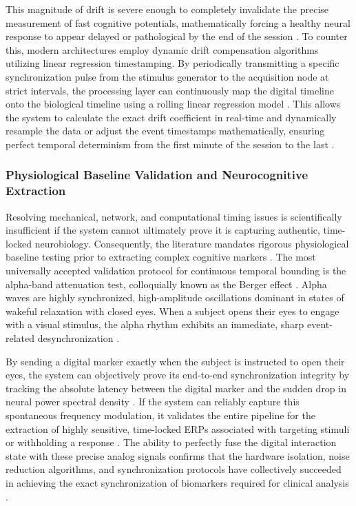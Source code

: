 This magnitude of drift is severe enough to completely invalidate the precise measurement of fast cognitive potentials, mathematically forcing a healthy neural response to appear delayed or pathological by the end of the session \cite{getzmann2024auditory}. To counter this, modern architectures employ dynamic drift compensation algorithms utilizing linear regression timestamping. By periodically transmitting a specific synchronization pulse from the stimulus generator to the acquisition node at strict intervals, the processing layer can continuously map the digital timeline onto the biological timeline using a rolling linear regression model \cite{li2022intelligent}. This allows the system to calculate the exact drift coefficient in real-time and dynamically resample the data or adjust the event timestamps mathematically, ensuring perfect temporal determinism from the first minute of the session to the last \cite{weber2025methods}.

\subsubsection{Physiological Baseline Validation and Neurocognitive Extraction}

Resolving mechanical, network, and computational timing issues is scientifically insufficient if the system cannot ultimately prove it is capturing authentic, time-locked neurobiology. Consequently, the literature mandates rigorous physiological baseline testing prior to extracting complex cognitive markers \cite{rykov2024predicting}. The most universally accepted validation protocol for continuous temporal bounding is the alpha-band attenuation test, colloquially known as the Berger effect \cite{ha2023validation}.  Alpha waves are highly synchronized, high-amplitude oscillations dominant in states of wakeful relaxation with closed eyes. When a subject opens their eyes to engage with a visual stimulus, the alpha rhythm exhibits an immediate, sharp event-related desynchronization \cite{catalano2024peak}.

By sending a digital marker exactly when the subject is instructed to open their eyes, the system can objectively prove its end-to-end synchronization integrity by tracking the absolute latency between the digital marker and the sudden drop in neural power spectral density \cite{palumbo2024wearable}.  If the system can reliably capture this spontaneous frequency modulation, it validates the entire pipeline for the extraction of highly sensitive, time-locked ERPs associated with targeting stimuli or withholding a response \cite{wascher2023neuroergonomics}. The ability to perfectly fuse the digital interaction state with these precise analog signals confirms that the hardware isolation, noise reduction algorithms, and synchronization protocols have collectively succeeded in achieving the exact synchronization of biomarkers required for clinical analysis \cite{lin2023design}.

